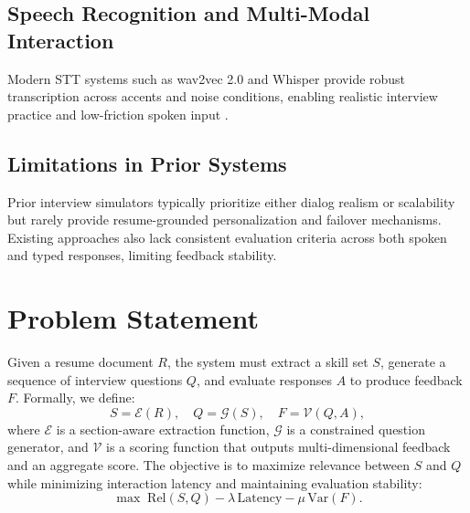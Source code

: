 \documentclass[conference]{IEEEtran}
\begin{document}
\subsection{Speech Recognition and Multi-Modal Interaction}
Modern STT systems such as wav2vec 2.0 and Whisper provide robust transcription across accents and noise conditions, enabling realistic interview practice and low-friction spoken input \cite{baevski2020wav2vec,radford2022whisper}.

\subsection{Limitations in Prior Systems}
Prior interview simulators typically prioritize either dialog realism or scalability but rarely provide resume-grounded personalization and failover mechanisms. Existing approaches also lack consistent evaluation criteria across both spoken and typed responses, limiting feedback stability.

\section{Problem Statement}
Given a resume document $R$, the system must extract a skill set $S$, generate a sequence of interview questions $Q$, and evaluate responses $A$ to produce feedback $F$. Formally, we define:
\begin{equation}
S = \mathcal{E}(R), \quad Q = \mathcal{G}(S), \quad F = \mathcal{V}(Q, A),
\end{equation}
where $\mathcal{E}$ is a section-aware extraction function, $\mathcal{G}$ is a constrained question generator, and $\mathcal{V}$ is a scoring function that outputs multi-dimensional feedback and an aggregate score. The objective is to maximize relevance between $S$ and $Q$ while minimizing interaction latency and maintaining evaluation stability:
\begin{equation}
\max \; \text{Rel}(S,Q) - \lambda\, \text{Latency} - \mu\, \text{Var}(F).
\end{equation}
\end{document}
